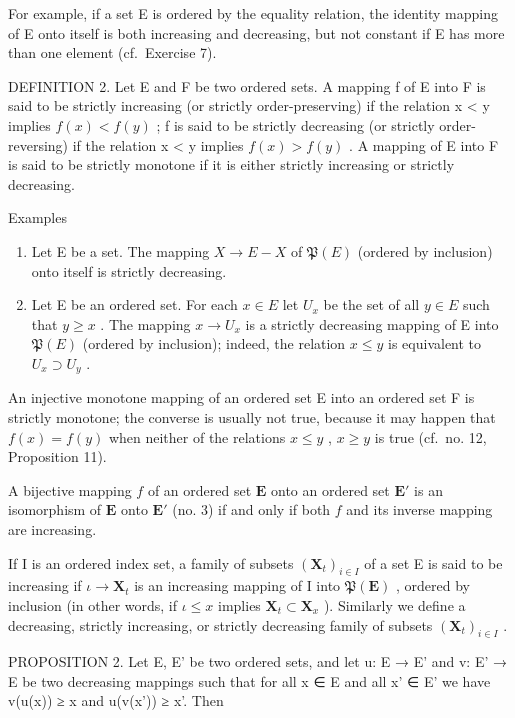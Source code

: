 For example, if a set E is ordered by the equality relation, the identity mapping of E onto itself is both increasing and decreasing, but not constant if E has more than one element (cf.~Exercise 7).

DEFINITION 2. Let E and F be two ordered sets. A mapping f of E into F is said to be strictly increasing (or strictly order-preserving) if the relation x \textless{} y implies \(f(x) < f(y)\) ; f is said to be strictly decreasing (or strictly order-reversing) if the relation x \textless{} y implies \(f(x) > f(y)\) . A mapping of E into F is said to be strictly monotone if it is either strictly increasing or strictly decreasing.

Examples

\begin{enumerate}
\def\labelenumi{(\arabic{enumi})}
\item
  Let E be a set. The mapping \(X \rightarrow E - X\) of \(\mathfrak{P}(E)\) (ordered by inclusion) onto itself is strictly decreasing.
\item
  Let E be an ordered set. For each \(x \in E\) let \(U_x\) be the set of all \(y \in E\) such that \(y \geqslant x\) . The mapping \(x \to U_x\) is a strictly decreasing mapping of E into \(\mathfrak{P}(E)\) (ordered by inclusion); indeed, the relation \(x \leqslant y\) is equivalent to \(U_x \supset U_y\) .
\end{enumerate}

An injective monotone mapping of an ordered set E into an ordered set F is strictly monotone; the converse is usually not true, because it may happen that \(f(x) = f(y)\) when neither of the relations \(x \leqslant y\) , \(x \geqslant y\) is true (cf.~no. 12, Proposition 11).

A bijective mapping \(f\) of an ordered set \(\mathbf{E}\) onto an ordered set \(\mathbf{E}'\) is an isomorphism of \(\mathbf{E}\) onto \(\mathbf{E}'\) (no. 3) if and only if both \(f\) and its inverse mapping are increasing.

If I is an ordered index set, a family of subsets \((\mathbf{X}_t)_{i \in I}\) of a set E is said to be increasing if \(\iota \to \mathbf{X}_t\) is an increasing mapping of I into \(\mathfrak{P}(\mathbf{E})\) , ordered by inclusion (in other words, if \(\iota \leqslant x\) implies \(\mathbf{X}_t \subset \mathbf{X}_x\) ). Similarly we define a decreasing, strictly increasing, or strictly decreasing family of subsets \((\mathbf{X}_t)_{i \in I}\) .

PROPOSITION 2. Let E, E' be two ordered sets, and let u: E → E' and v: E' → E be two decreasing mappings such that for all x ∈ E and all x' ∈ E' we have v(u(x)) ≥ x and u(v(x')) ≥ x'. Then

